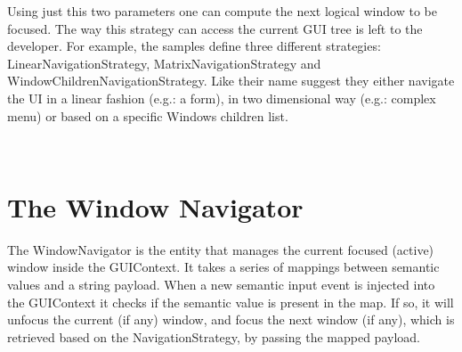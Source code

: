 Using just this two parameters one can compute the next logical window to be focused. The way this strategy can access the current G\+UI tree is left to the developer. For example, the samples define three different strategies\+: Linear\+Navigation\+Strategy, Matrix\+Navigation\+Strategy and Window\+Children\+Navigation\+Strategy. Like their name suggest they either navigate the UI in a linear fashion (e.\+g.\+: a form), in two dimensional way (e.\+g.\+: complex menu) or based on a specific Window\textquotesingle{}s children list.

~\newline
 \hypertarget{gui_navigation_tutorial_gui_navigation_tutorial_window_navigator}{}\section{The Window Navigator}\label{gui_navigation_tutorial_gui_navigation_tutorial_window_navigator}
The Window\+Navigator is the entity that manages the current focused (active) window inside the G\+U\+I\+Context. It takes a series of mappings between semantic values and a string payload. When a new semantic input event is injected into the G\+U\+I\+Context it checks if the semantic value is present in the map. If so, it will unfocus the current (if any) window, and focus the next window (if any), which is retrieved based on the Navigation\+Strategy, by passing the mapped payload.

